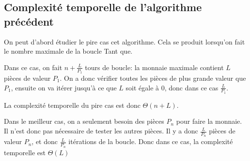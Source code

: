 \documentclass[10.9pt]{article} %
\begin{document}
\begin{algorithm}
\end{algorithm}

\subsection{Complexité temporelle de l'algorithme précédent}

On peut d'abord étudier le pire cas cet algorithme. Cela se produit lorsqu'on fait le 
nombre maximale de la boucle Tant que.

Dans ce cas, on fait $n + \frac{L}{P_1}$ tours de boucle: la monnaie maximale contient $L$ pièces
de valeur $P_1$. On a donc vérifier toutes les pièces de plus grande valeur que $P_1$, ensuite
on va itérer jusqu'à ce que $L$ soit égale à 0, donc dans ce cas $\frac{L}{P_1}$. 

La complexité temporelle du pire cas est donc $\Theta(n + L)$.

Dans le meilleur cas, on a seulement besoin des pièces $P_n$ pour faire la monnaie. Il n'est donc
pas nécessaire de tester les autres pièces. Il y a donc $\frac{L}{P_n}$ pièces de valeur $P_n$, et
donc $\frac{L}{P_n}$ itérations de la boucle. Donc dans ce cas, la complexité temporelle est
$\Theta(L)$
\end{document}
